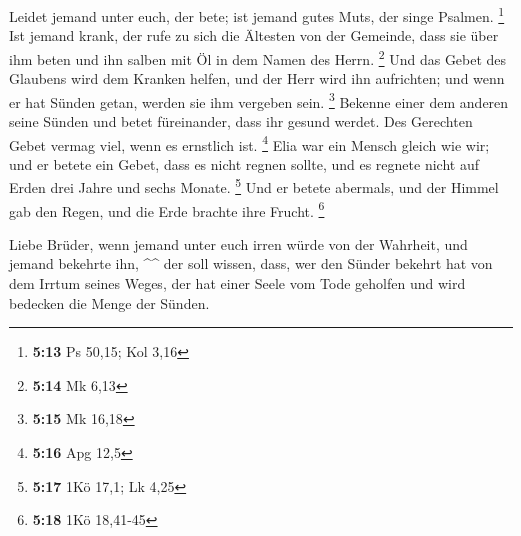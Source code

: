 Leidet jemand unter euch, der bete; ist jemand gutes
Muts, der singe Psalmen. \footnote{\textbf{5:13} Ps 50,15; Kol 3,16}
 Ist jemand krank, der rufe zu sich die Ältesten von der
Gemeinde, dass sie über ihm beten und ihn salben mit Öl in dem Namen des
Herrn. \footnote{\textbf{5:14} Mk 6,13}  Und das Gebet
des Glaubens wird dem Kranken helfen, und der Herr wird ihn aufrichten;
und wenn er hat Sünden getan, werden sie ihm vergeben sein. \footnote{\textbf{5:15}
  Mk 16,18}  Bekenne einer dem anderen seine Sünden und
betet füreinander, dass ihr gesund werdet. Des Gerechten Gebet vermag
viel, wenn es ernstlich ist. \footnote{\textbf{5:16} Apg 12,5}
 Elia war ein Mensch gleich wie wir; und er betete ein
Gebet, dass es nicht regnen sollte, und es regnete nicht auf Erden drei
Jahre und sechs Monate. \footnote{\textbf{5:17} 1Kö 17,1; Lk 4,25}
 Und er betete abermals, und der Himmel gab den Regen,
und die Erde brachte ihre Frucht. \footnote{\textbf{5:18} 1Kö 18,41-45}

 Liebe Brüder, wenn jemand unter euch irren würde von der
Wahrheit, und jemand bekehrte ihn, \^{}\^{}  der soll
wissen, dass, wer den Sünder bekehrt hat von dem Irrtum seines Weges,
der hat einer Seele vom Tode geholfen und wird bedecken die Menge der
Sünden.
